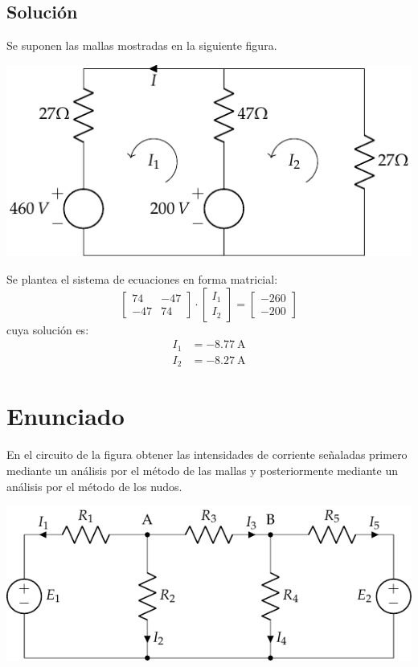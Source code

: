 \subsection*{Solución}
Se suponen las mallas mostradas en la siguiente figura.

\begin{center}
  \includegraphics{figuras/BT1_04_mallas.pdf}
\end{center}

Se plantea el sistema de ecuaciones en forma matricial:
\begin{equation*}
  \begin{bmatrix}
    74 & -47  \\
    -47 & 74
  \end{bmatrix} \cdot
  \begin{bmatrix}
    I_1\\
    I_2
  \end{bmatrix} =
  \begin{bmatrix}
    -260 \\
    -200
  \end{bmatrix}
\end{equation*}
cuya solución es:
\begin{align*}
  I_1&=\qty{-8.77}{\ampere}\\
  I_2&=\qty{-8.27}{\ampere}
\end{align*}

\section{Enunciado}
En el circuito de la figura obtener las intensidades de corriente
señaladas primero mediante un análisis por el método de las mallas y
posteriormente mediante un análisis por el método de los nudos.

\begin{center}
  \includegraphics{figuras/BT1_08.pdf}
\end{center}

